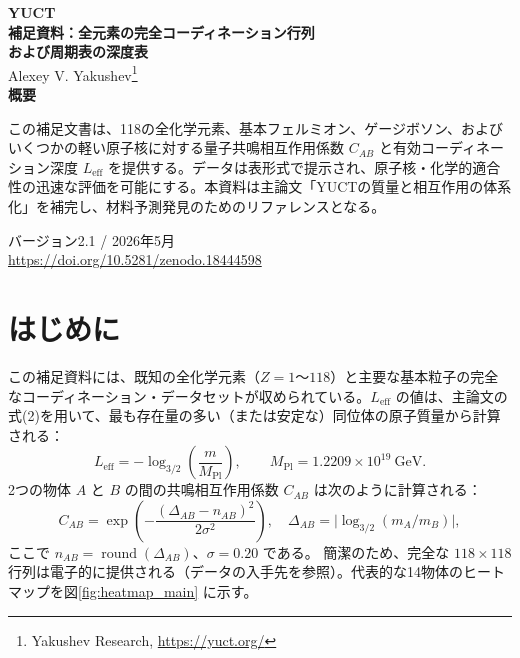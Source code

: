 \documentclass[12pt,a4paper]{article}
\begin{document}
	\begin{titlepage}
		\centering
		\vspace*{3cm}
		{\sffamily\bfseries\color{skyblue}\fontsize{40}{40}\selectfont YUCT}\\[1.5cm]
		{\sffamily\bfseries\LARGE 補足資料：全元素の完全コーディネーション行列\\[0.3cm]
			および周期表の深度表}\\[1cm]
		{\large Alexey V. Yakushev\footnote{Yakushev Research, \url{https://yuct.org/}}}\\[0.5cm]
		{\color{darkblue}\bfseries\Large 概要}\\[0.3cm]
		\begin{minipage}{0.85\textwidth}
			\large
			この補足文書は、118の全化学元素、基本フェルミオン、ゲージボソン、およびいくつかの軽い原子核に対する量子共鳴相互作用係数 $C_{AB}$ と有効コーディネーション深度 $L_{\mathrm{eff}}$ を提供する。データは表形式で提示され、原子核・化学的適合性の迅速な評価を可能にする。本資料は主論文「YUCTの質量と相互作用の体系化」を補完し、材料予測発見のためのリファレンスとなる。
		\end{minipage}
		\vfill
		{\small バージョン2.1 / 2026年5月}\\
		{\footnotesize \url{https://doi.org/10.5281/zenodo.18444598}}
	\end{titlepage}
	
	\tableofcontents
	\clearpage
	
	\section{はじめに}
	この補足資料には、既知の全化学元素（$Z = 1$～$118$）と主要な基本粒子の完全なコーディネーション・データセットが収められている。$L_{\mathrm{eff}}$ の値は、主論文の式(2)を用いて、最も存在量の多い（または安定な）同位体の原子質量から計算される：
	\[
	L_{\mathrm{eff}} = -\log_{3/2}\!\left( \frac{m}{M_{\mathrm{Pl}}} \right),
	\qquad M_{\mathrm{Pl}} = 1.2209\times 10^{19}~\text{GeV}.
	\]
	2つの物体 $A$ と $B$ の間の共鳴相互作用係数 $C_{AB}$ は次のように計算される：
	\[
	C_{AB} = \exp\!\left( - \frac{(\Delta_{AB} - n_{AB})^2}{2\sigma^2} \right),\quad
	\Delta_{AB} = \bigl|\log_{3/2}(m_A/m_B)\bigr|,
	\]
	ここで $n_{AB} = \operatorname{round}(\Delta_{AB})$、$\sigma = 0.20$ である。
	簡潔のため、完全な $118\times118$ 行列は電子的に提供される（データの入手先を参照）。代表的な14物体のヒートマップを図\ref{fig:heatmap_main} に示す。
	
\end{document}
